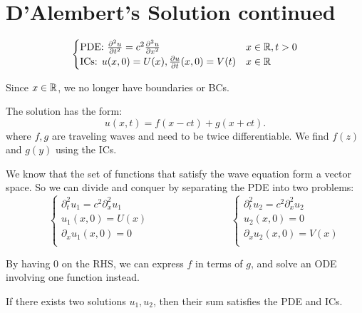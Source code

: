 \documentclass[class=article,crop=false]{standalone}
\begin{document}
\section{D'Alembert's Solution continued}
\begin{equation*}
\begin{cases}
	\text{PDE: } \frac{\partial^2 u}{\partial { t}^2} =c^2 \frac{\partial^2 u}{\partial { x}^2}  & x \in \mathbb{R}, t>0 \\
	\text{ICs: } u(x,0)=U(x), \frac{\partial u}{\partial t} (x,0)=V(t) & x \in \mathbb{R} \\
\end{cases}
\end{equation*}
\begin{note}[]
Since $ x \in \mathbb{R}$, we no longer have boundaries or BCs.
\end{note}
The solution has the form:
\[
	u(x,t)=f(x-ct)+g(x+ct)
.\] 
where $ f,g$ are traveling waves and need to be twice differentiable. We find  $ f(z)$ and  $ g(y)$ using the ICs.

We know that the set of functions that satisfy the wave equation form a vector space. So we can divide and conquer by separating the PDE into two problems:
 \begin{equation*}
\qquad 
\begin{cases}
\partial_t^2 u_1 = c^2 \partial_x^2 u_1 \qquad \\
u_1(x,0)=U(x) \qquad \qquad \qquad \qquad \\
\partial_x u_1 (x,0) = 0 \qquad \qquad  \\
\end{cases}
\begin{cases}
\partial_t^2 u_2 = c^2 \partial_x^2 u_2\\
u_2(x,0)=0\\
\partial_x u_2 (x,0) = V(x)\\
\end{cases}
\end{equation*}
\begin{intuition}
	By having 0 on the RHS, we can express $ f$ in terms of  $ g$, and solve an ODE involving one function instead.
\end{intuition}
If there exists two solutions $ u_1,u_2$, then their sum satisfies the PDE and ICs.
\end{document}
